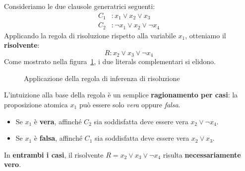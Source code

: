 \begin{exa}
    Consideriamo le due clausole generatrici seguenti:
    \[
        \begin{aligned}
            C_1 &: x_1 \lor x_2 \lor x_3 \\
            C_2 &: \neg x_1 \lor x_2 \lor \neg x_4
        \end{aligned}
    \]
    Applicando la regola di risoluzione rispetto alla variabile $x_1$, otteniamo il 
    \textbf{risolvente}:
    \[
        R : x_2 \lor x_3 \lor \neg x_4
    \]
    Come mostrato nella figura~\ref{fig:06_01_RegolaRisoluzione}, i due literals 
    complementari si elidono.
\end{exa}

\begin{figure}[!ht]
    \centering
    \caption{Applicazione della regola di inferenza di risoluzione}
    \label{fig:06_01_RegolaRisoluzione}
\end{figure}

L'intuizione alla base della regola è un semplice \textbf{ragionamento per casi}: 
la proposizione atomica $x_1$ può essere solo \textit{vera} oppure \textit{falsa}.
\begin{itemize}
    \item Se $x_1$ è \textbf{vera}, affinché $C_2$ sia soddisfatta deve essere vera 
        $x_2 \lor \neg x_4$.
    \item Se $x_1$ è \textbf{falsa}, affinché $C_1$ sia soddisfatta deve essere vera 
        $x_2 \lor x_3$.
\end{itemize}
In \textbf{entrambi i casi}, il risolvente $R = x_2 \lor x_3 \lor \neg x_4$ risulta 
\textbf{necessariamente vero}.

